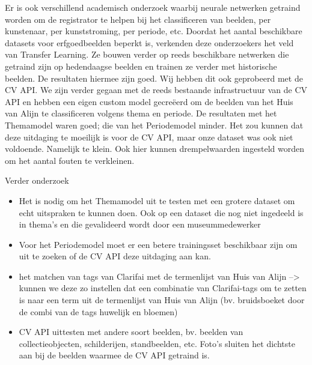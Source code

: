 Er is ook verschillend academisch onderzoek waarbij neurale netwerken getraind worden om de registrator te helpen bij het classificeren van beelden, per kunstenaar, per kunststroming, per periode, etc. Doordat het aantal beschikbare datasets voor erfgoedbeelden beperkt is, verkenden deze onderzoekers het veld van Transfer Learning. Ze bouwen verder op reeds beschikbare netwerken die getraind zijn op hedendaagse beelden en trainen ze verder met historische beelden. De resultaten hiermee zijn goed.
Wij hebben dit ook geprobeerd met de CV API. We zijn verder gegaan met de reeds bestaande infrastructuur van de CV API en hebben een eigen custom model gecreëerd om de beelden van het Huis van Alijn te classificeren volgens thema en periode. De resultaten met het Themamodel waren goed; die van het Periodemodel minder. Het zou kunnen dat deze uitdaging te moeilijk is voor de CV API, maar onze dataset was ook niet voldoende. Namelijk te klein. Ook hier kunnen drempelwaarden ingesteld worden om het aantal fouten te verkleinen.

Verder onderzoek
\begin{itemize}
	\item Het is nodig om het Themamodel uit te testen met een grotere dataset om echt uitspraken te kunnen doen. Ook op een dataset die nog niet ingedeeld is in thema's en die gevalideerd wordt door een museummedewerker
	\item Voor het Periodemodel moet er een betere trainingsset beschikbaar zijn om uit te zoeken of de CV API deze uitdaging aan kan.
	\item het matchen van tags van Clarifai met de termenlijst van Huis van Alijn --> kunnen we deze zo instellen dat een combinatie van Clarifai-tags om te zetten is naar een term uit de termenlijst van Huis van Alijn (bv. bruidsboeket door de combi van de tags huwelijk en bloemen)
	\item CV API uittesten met andere soort beelden, bv. beelden van collectieobjecten, schilderijen, standbeelden, etc. Foto's sluiten het dichtste aan bij de beelden waarmee de CV API getraind is.
\end{itemize}


